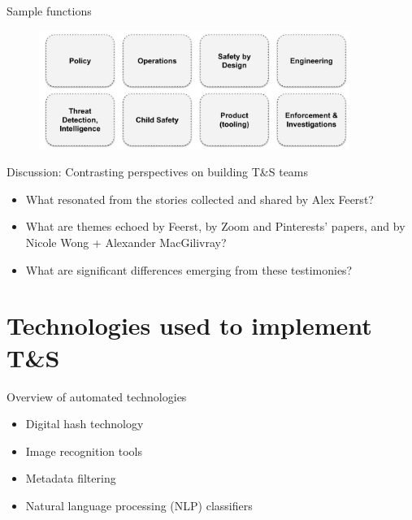 \documentclass[nobackground,dvipsnames,table]{beamer}
\begin{document}
\begin{frame}{Sample functions}
	\begin{figure}[ht]
		\begin{center}
			\includegraphics[width=0.9\textwidth]{img/squares.jpg}
		\end{center}
	\end{figure}
\end{frame}

\begin{frame}{Discussion: Contrasting perspectives on building T\&S teams}
	\begin{itemize}
		\item What resonated from the stories collected and shared by Alex Feerst?
		\item What are themes echoed by Feerst, by Zoom and Pinterests’ papers, and by Nicole Wong + Alexander MacGilivray?
		\item What are significant differences emerging from these testimonies?
	\end{itemize}
\end{frame}

\section{Technologies used to implement T\&S}

\begin{frame}{Overview of automated technologies}
	\begin{itemize}
		\item Digital hash technology
		\item Image recognition tools
		\item Metadata filtering
		\item Natural language processing (NLP) classifiers
	\end{itemize}
\end{frame}

\end{document}
